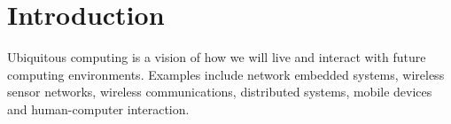 \section{Introduction}
\begin{mytitle} Ubiquitous computing is a vision of how we will live and interact with future computing environments. Examples include network embedded systems, wireless sensor networks, wireless communications, distributed systems, mobile devices and human-computer interaction.
\end{mytitle}